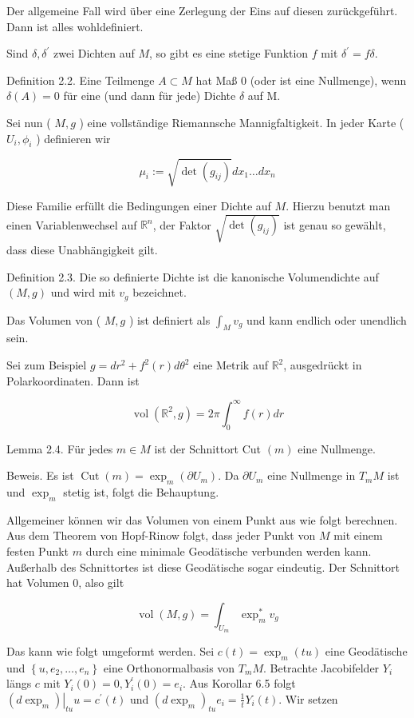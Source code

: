 \documentclass[10pt, letterpaper]{article}
\begin{document}
Der allgemeine Fall wird über eine Zerlegung der Eins auf diesen zurückgeführt. Dann ist alles wohldefiniert.

Sind $\delta, \delta^{\prime}$ zwei Dichten auf $M$, so gibt es eine stetige Funktion $f$ mit $\delta^{\prime}=f \delta$.

Definition 2.2. Eine Teilmenge $A \subset M$ hat Maß 0 (oder ist eine Nullmenge), wenn $\delta(A)=0$ für eine (und dann für jede) Dichte $\delta$ auf M.

Sei nun ( $M, g$ ) eine vollständige Riemannsche Mannigfaltigkeit. In jeder Karte ( $U_{i}, \phi_{i}$ ) definieren wir

$$
\mu_{i}:=\sqrt{\operatorname{det}\left(g_{i j}\right)} d x_{1} \ldots d x_{n}
$$

Diese Familie erfüllt die Bedingungen einer Dichte auf $M$. Hierzu benutzt man einen Variablenwechsel auf $\mathbb{R}^{n}$, der Faktor $\sqrt{\operatorname{det}\left(g_{i j}\right)}$ ist genau so gewählt, dass diese Unabhängigkeit gilt.

Definition 2.3. Die so definierte Dichte ist die kanonische Volumendichte auf $(M, g)$ und wird mit $v_{g}$ bezeichnet.

Das Volumen von ( $M, g$ ) ist definiert als $\int_{M} v_{g}$ und kann endlich oder unendlich sein.

Sei zum Beispiel $g=d r^{2}+f^{2}(r) d \theta^{2}$ eine Metrik auf $\mathbb{R}^{2}$, ausgedrückt in Polarkoordinaten. Dann ist

$$
\operatorname{vol}\left(\mathbb{R}^{2}, g\right)=2 \pi \int_{0}^{\infty} f(r) d r
$$

Lemma 2.4. Für jedes $m \in M$ ist der Schnittort Cut $(m)$ eine Nullmenge.

Beweis. Es ist $\operatorname{Cut}(m)=\exp _{m}\left(\partial U_{m}\right)$. Da $\partial U_{m}$ eine Nullmenge in $T_{m} M$ ist und $\exp _{m}$ stetig ist, folgt die Behauptung.

Allgemeiner können wir das Volumen von einem Punkt aus wie folgt berechnen. Aus dem Theorem von Hopf-Rinow folgt, dass jeder Punkt von $M$ mit einem festen Punkt $m$ durch eine minimale Geodätische verbunden werden kann. Außerhalb des Schnittortes ist diese Geodätische sogar eindeutig. Der Schnittort hat Volumen 0, also gilt

$$
\operatorname{vol}(M, g)=\int_{U_{m}} \exp _{m}^{*} v_{g}
$$

Das kann wie folgt umgeformt werden. Sei $c(t)=\exp _{m}(t u)$ eine Geodätische und $\left\{u, e_{2}, \ldots, e_{n}\right\}$ eine Orthonormalbasis von $T_{m} M$. Betrachte Jacobifelder $Y_{i}$ längs $c$ mit $Y_{i}(0)=0, Y_{i}^{\prime}(0)=e_{i}$. Aus Korollar 6.5 folgt $\left.\left(d \exp _{m}\right)\right|_{t u} u=c^{\prime}(t)$ und $\left(d \exp _{m}\right)_{t u} e_{i}=\frac{1}{t} Y_{i}(t)$. Wir setzen
\end{document}

